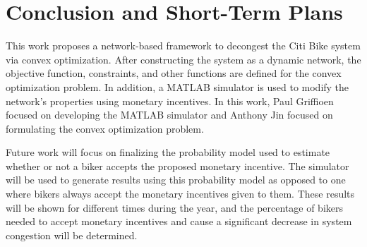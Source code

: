 \documentclass[times, 10pt,twocolumn]{article}
\begin{document}



\section{Conclusion and Short-Term Plans}
This work proposes a network-based framework to decongest the Citi Bike system via convex optimization. After constructing the system as a dynamic network, the objective function, constraints, and other functions are defined for the convex optimization problem. In addition, a MATLAB simulator is used to modify the network's properties using monetary incentives. In this work, Paul Griffioen focused on developing the MATLAB simulator and Anthony Jin focused on formulating the convex optimization problem.

Future work will focus on finalizing the probability model used to estimate whether or not a biker accepts the proposed monetary incentive. The simulator will be used to generate results using this probability model as opposed to one where bikers always accept the monetary incentives given to them. These results will be shown for different times during the year, and the percentage of bikers needed to accept monetary incentives and cause a significant decrease in system congestion will be determined.

\end{document}
